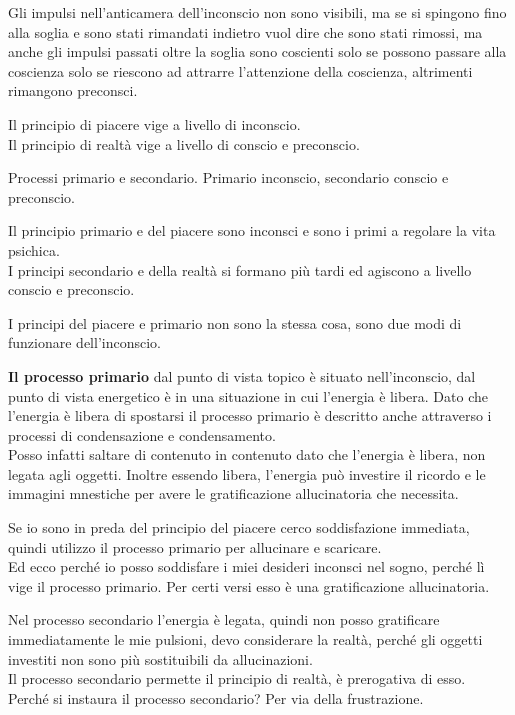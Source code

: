 \documentclass[
]{article}
\begin{document}
Gli impulsi nell'anticamera dell'inconscio non sono visibili, ma se si
spingono fino alla soglia e sono stati rimandati indietro vuol dire che
sono stati rimossi, ma anche gli impulsi passati oltre la soglia sono
coscienti solo se possono passare alla coscienza solo se riescono ad
attrarre l'attenzione della coscienza, altrimenti rimangono preconsci.

Il principio di piacere vige a livello di inconscio.\\
Il principio di realtà vige a livello di conscio e preconscio.

Processi primario e secondario. Primario inconscio, secondario conscio e
preconscio.

Il principio primario e del piacere sono inconsci e sono i primi a
regolare la vita psichica.\\
I principi secondario e della realtà si formano più tardi ed agiscono a
livello conscio e preconscio.

I principi del piacere e primario non sono la stessa cosa, sono due modi
di funzionare dell'inconscio.

\textbf{Il processo primario} dal punto di vista topico è situato
nell'inconscio, dal punto di vista energetico è in una situazione in cui
l'energia è libera. Dato che l'energia è libera di spostarsi il processo
primario è descritto anche attraverso i processi di condensazione e
condensamento.\\
Posso infatti saltare di contenuto in contenuto dato che l'energia è
libera, non legata agli oggetti. Inoltre essendo libera, l'energia può
investire il ricordo e le immagini mnestiche per avere le gratificazione
allucinatoria che necessita.

Se io sono in preda del principio del piacere cerco soddisfazione
immediata, quindi utilizzo il processo primario per allucinare e
scaricare.\\
Ed ecco perché io posso soddisfare i miei desideri inconsci nel sogno,
perché lì vige il processo primario. Per certi versi esso è una
gratificazione allucinatoria.

Nel processo secondario l'energia è legata, quindi non posso gratificare
immediatamente le mie pulsioni, devo considerare la realtà, perché gli
oggetti investiti non sono più sostituibili da allucinazioni.\\
Il processo secondario permette il principio di realtà, è prerogativa di
esso.\\
Perché si instaura il processo secondario? Per via della frustrazione.
\end{document}
